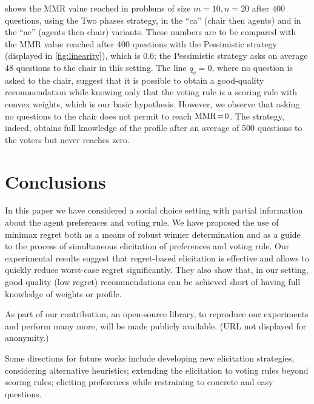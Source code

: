 \documentclass{article}
\begin{document}
 shows the MMR value reached in problems of size $m = 10, n = 20$ after $400$ questions, using the Two phases strategy, in the “ca” (chair then agents) and in the “ac” (agents then chair) variants. These numbers are to be compared with the MMR value reached after 400 questions with the Pessimistic strategy (displayed in \cref{fig:linearity}), which is $0.6$; the Pessimistic strategy asks on average $48$ questions to the chair in this setting.
The line $q_c = 0$, where no question is asked to the chair, suggest that it is possible to obtain a good-quality recommendation while knowing only that the voting rule is a scoring rule with convex weights, which is our basic hypothesis. However, we observe that asking no questions to the chair does not permit to reach $\operatorname{MMR}\!=\!0$. The strategy, indeed, obtains full knowledge of the profile after an average of 500 questions to the voters but never reaches zero.

\section{Conclusions}  
\label{sec:conclusions}
In this paper we have considered a social choice setting with partial information about the agent preferences and voting rule.
We have proposed the use of minimax regret both as a means of robust winner determination and as a guide to the process of simultaneous elicitation of preferences and voting rule.
Our experimental results %
suggest that regret-based elicitation is effective and allows to quickly reduce worst-case regret significantly. They also show that, in our setting, good quality (low regret) recommendations can be achieved short of having full knowledge of weights or profile.

As part of our contribution, an open-source library, to reproduce our experiments and perform many more, will be made publicly available. (URL not displayed for anonymity.)

Some directions for future works include developing new elicitation strategies, considering alternative heuristics; extending the elicitation to voting rules beyond scoring rules; eliciting preferences while restraining to concrete and easy questions.
\end{document}
